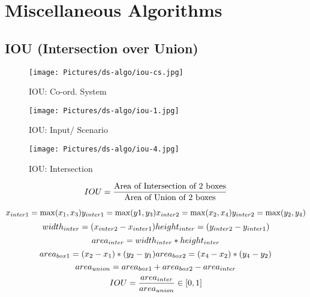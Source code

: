 \chapter{Miscellaneous Algorithms}

\section{IOU (Intersection over Union) \cite{medium/analytics-vidhya/iou-intersection-over-union-705a39e7acef}}\label{IOU (Intersection over Union)}

\begin{table}[H]
    \begin{minipage}[b]{0.325\linewidth}
        \begin{figure}[H]
            \centering
            \texttt{[image: Pictures/ds-algo/iou-cs.jpg]}
            \caption{IOU: Co-ord. System}
        \end{figure}
    \end{minipage}
    \hfill
    \begin{minipage}[b]{0.325\linewidth}
        \begin{figure}[H]
            \centering
            \texttt{[image: Pictures/ds-algo/iou-1.jpg]}
            \caption{IOU: Input/ Scenario}
        \end{figure}
    \end{minipage}
    \hfill
    \begin{minipage}[b]{0.325\linewidth}
        \begin{figure}[H]
            \centering
            \texttt{[image: Pictures/ds-algo/iou-4.jpg]}
            \caption{IOU: Intersection}
        \end{figure}
    \end{minipage}
\end{table}

\[
    \hfill
    \displaystyle IOU = \dfrac{\text{Area of Intersection of 2 boxes}}{\text{Area of Union of 2 boxes}}
    \hfill
\]

\begin{adjustwidth}{-2cm}{-2cm}

\[
    \hfill
    x_{inter1} = \max(x_1, x_3) 
    \hfill 
    y_{inter1} = \max(y1, y_3)
    \hfill
    x_{inter2} = \max(x_2, x_4) 
    \hfill 
    y_{inter2} = \max(y_2, y_4)
    \hfill
\]
\[
    \hfill
    width_{inter} = (x_{inter2} - x_{inter1})
    \hfill
    height_{inter} = (y_{inter2} - y_{inter1})
    \hfill
\]
\[
    \hfill
    area_{inter} = width_{inter} * height_{inter}
    \hfill
\]
\[
    \hfill
    area_{box1} = (x_2 - x_1) * (y_2 - y_1)
    \hfill
    area_{box2} = (x_4 - x_2) * (y_4 - y_2)
    \hfill
\]
\[
    \hfill
    area_{union} = area_{box1} + area_{box2} - area_{inter}
    \hfill
\]
\[
    \displaystyle
    \hfill
    IOU = \dfrac{area_{inter}}{area_{union}} \in [0,1]
    \hfill
\]

\end{adjustwidth}

